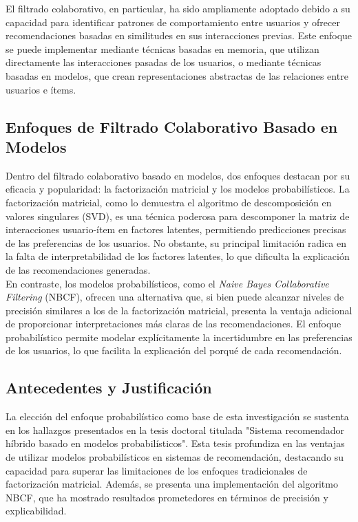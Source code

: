 \documentclass[twocolumn, fontsize=10pt]{article}
\begin{document}
El filtrado colaborativo, en particular, 
ha sido ampliamente adoptado debido a su capacidad 
para identificar patrones de comportamiento entre 
usuarios y ofrecer recomendaciones basadas en 
similitudes en sus interacciones previas. 
Este enfoque se puede implementar mediante técnicas 
basadas en memoria, que utilizan directamente las 
interacciones pasadas de los usuarios, o mediante 
técnicas basadas en modelos, que crean representaciones 
abstractas de las relaciones entre usuarios e ítems.

\subsection{Enfoques de Filtrado Colaborativo Basado en Modelos}

Dentro del filtrado colaborativo basado en modelos, 
dos enfoques destacan por su eficacia y popularidad: 
la factorización matricial y los modelos probabilísticos. 
La factorización matricial, como lo demuestra el 
algoritmo de descomposición en valores singulares (SVD), 
es una técnica poderosa para descomponer la matriz de 
interacciones usuario-ítem en factores latentes, 
permitiendo predicciones precisas de las preferencias 
de los usuarios. No obstante, su principal limitación 
radica en la falta de interpretabilidad de los factores 
latentes, lo que dificulta la explicación de las 
recomendaciones generadas.\\

En contraste, los modelos probabilísticos, 
como el \textit{Naive Bayes Collaborative Filtering} (NBCF), 
ofrecen una alternativa que, si bien puede alcanzar 
niveles de precisión similares a los de la 
factorización matricial, presenta la ventaja adicional 
de proporcionar interpretaciones más claras de las 
recomendaciones. El enfoque probabilístico permite 
modelar explícitamente la incertidumbre en las 
preferencias de los usuarios, lo que facilita la 
explicación del porqué de cada recomendación.

\subsection{Antecedentes y Justificación}

La elección del enfoque probabilístico como base de 
esta investigación se sustenta en los hallazgos 
presentados en la tesis doctoral titulada 
"Sistema recomendador híbrido basado en modelos 
probabilísticos". Esta tesis profundiza en las ventajas 
de utilizar modelos probabilísticos en sistemas de 
recomendación, destacando su capacidad para superar 
las limitaciones de los enfoques tradicionales de 
factorización matricial. Además, se presenta una 
implementación del algoritmo NBCF, que ha mostrado 
resultados prometedores en términos de precisión y 
explicabilidad.\\
\end{document}
